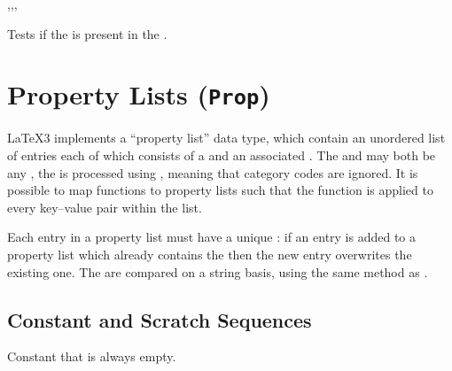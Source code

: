 \documentclass[oneside]{book}
\begin{document}
\begin{function}{\seqVarIfIn,\seqVarIfInT,\seqVarIfInF,\seqVarIfInTF}
\begin{syntax}
  
   
   
    
\end{syntax}
Tests if the  is present in the .
\begin{demohigh}
\seqSetFromClist {}
\seqVarIfInTF {} {} {}
\seqVarIfInTF {} {} {}
\end{demohigh}
\end{function}

\chapter{Property Lists (\texttt{Prop})}

\LaTeX3 implements a \enquote{property list} data type, which contain
an unordered list of entries each of which consists of a  and
an associated . The  and  may both
be any , the  is processed using
, meaning that category codes are ignored. It is possible to
map functions to property lists such that the function is applied to every
key--value pair within the list.

Each entry in a property list must have a unique : if an entry is
added to a property list which already contains the  then the new
entry overwrites the existing one. The  are compared on a
string basis, using the same method as .


\section{Constant and Scratch Sequences}

\begin{variable}{\cEmptyProp}
Constant that is always empty.
\end{variable}
\end{document}
